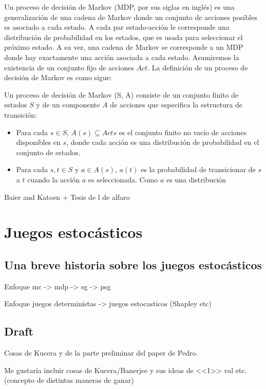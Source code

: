 Un proceso de decisión de Markov (MDP, por sus siglas en inglés) es una
generalización de una cadena de Markov donde un conjunto de acciones posibles
es asociado a cada estado. A cada par estado-acción le corresponde una
distribución de probabilidad en los estados, que es usada para seleccionar el
próximo estado. A su vez, una cadena de Markov se corresponde a un MDP donde
hay exactamente una acción asociada a cada estado. Asumiremos la existencia de
un conjunto fijo de acciones $Act$. La definición de un proceso de decisión de
Markov es como sigue:

\begin{definition}
	Un proceso de decisión de Markov (S, A) consiste de un conjunto finito de estados $S$ y de un componente $A$ de acciones que especifica la estructura de transición:
	\begin{itemize}
		\item Para cada $s \in S$, $A(s) \subseteq Acts$ es el conjunto finito no vacío de
		      acciones disponibles en $s$, donde cada acción es una distribución de
		      probabilidad en el conjunto de estados.
		\item Para cada $s, t \in S$ y $a \in A(s)$, $a(t)$ es la probabilidad de
		      transicionar de $s$ a $t$ cuando la acción $a$ es seleccionada. Como $a$ es una
		      distribución
	\end{itemize}
\end{definition}

Baier and Katoen + Tesis de l de alfaro

\section{Juegos estocásticos}

\subsection{Una breve historia sobre los juegos estocásticos}

Enfoque mc -> mdp -> sg -> psg

Enfoque juegos deterministas -> juegos estocasticos (Shapley etc)

\subsection{Draft}
Cosas de Kucera y de la parte preliminar del paper de Pedro.

Me gustaría incluir cosas de Kucera/Banerjee y sus ideas de <<1>> val etc.
(concepto de distintas maneras de ganar)

